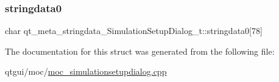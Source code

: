 \subsubsection{\texorpdfstring{stringdata0}{stringdata0}}
{\footnotesize\ttfamily char qt\+\_\+meta\+\_\+stringdata\+\_\+\+Simulation\+Setup\+Dialog\+\_\+t\+::stringdata0\mbox{[}78\mbox{]}}



The documentation for this struct was generated from the following file\+:\begin{DoxyCompactItemize}
\item 
qtgui/moc/\mbox{\hyperlink{moc__simulationsetupdialog_8cpp}{moc\+\_\+simulationsetupdialog.\+cpp}}\end{DoxyCompactItemize}

